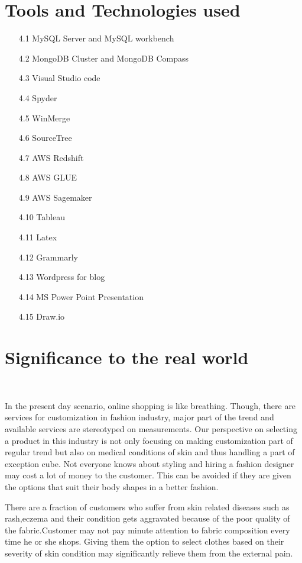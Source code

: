 \documentclass[11pt,journal,compsoc]{IEEEtran}
\begin{document}
\section{Tools and Technologies used}
\begin{itemize}
    \item[4.1] MySQL Server and MySQL workbench 
    \item[4.2] MongoDB Cluster and MongoDB Compass
    \item[4.3] Visual Studio code 
    \item[4.4] Spyder 
    \item[4.5] WinMerge 
    \item[4.6] SourceTree 
    \item[4.7] AWS Redshift 
    \item[4.8] AWS GLUE 
    \item[4.9] AWS Sagemaker 
    \item[4.10] Tableau  
    \item[4.11] Latex  
    \item[4.12] Grammarly 
    \item[4.13] Wordpress for blog  
    \item[4.14] MS Power Point Presentation  
    \item[4.15] Draw.io  
\end{itemize}

\section{Significance to the real world}\

In the present day scenario, online shopping is like breathing. Though, there are services for customization in fashion industry, major part of the trend and available services are stereotyped on measurements. Our perspective on selecting a product in this industry is not only focusing on making customization part of regular trend but also on medical conditions of skin and thus handling a part of exception cube. Not everyone knows about styling and hiring a fashion designer may cost a lot of money to the customer. This can be avoided if they are given the options that suit their body shapes in a better fashion. \

There are a fraction of customers who suffer from skin related diseases such as rash,eczema and their condition gets aggravated because of the poor quality of the fabric.Customer may not pay minute attention to fabric composition every time he or she shops. Giving them the option to select clothes based on their severity of skin condition may significantly relieve them from the external pain. \
\end{document}
